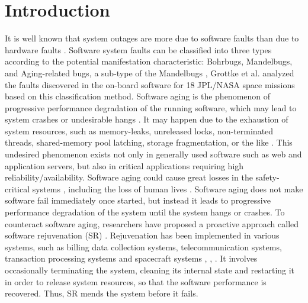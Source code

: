 \documentclass[10pt,journal,letterpaper,compsoc]{IEEEtran}
\begin{document}
%
\IEEEpeerreviewmaketitle

\section{Introduction} %
\label{intro}
It is well known that system outages are more due to software faults than due to hardware faults \cite{ChScience:SGarg1998IEEEJC}.
Software system faults can be classified into three types according to the
potential manifestation characteristic:
Bohrbugs, Mandelbugs, and Aging-related bugs,
a sub-type of the Mandelbugs \cite{ChScience:MGrottke2007IEEEMC},
Grottke et al. analyzed the faults discovered in the on-board software for
18 JPL/NASA space missions \cite{ChScience:MGrottke2010DSN}
based on this classification method. Software aging is the phenomenon of
progressive performance degradation of the running software,
which may lead to system crashes or undesirable hangs \cite{ChScience:SGarg1998ISSRE}.
It may happen due to the exhaustion of system resources, such as memory-leaks,
unreleased locks, non-terminated threads, shared-memory pool latching,
storage fragmentation, or the like \cite{ChScience:YHuang1995SFTC}.
This undesired phenomenon exists not only in generally used software such as web
and application servers, but also in critical applications requiring high
reliability/availability.
Software aging could cause great losses in
the safety-critical systems \cite{ChScience:YFJia2008APSEC},
including the loss of human lives \cite{ChScience:EMarshall1992Science}.
Software aging does not make software fail immediately once started,
but instead it leads to progressive performance degradation of the system until
the system hangs or crashes.
To counteract software aging, researchers have proposed a proactive approach
called software rejuvenation (SR) \cite{ChScience:SGarg1998ISSRE}.
Rejuvenation has been implemented in various systems,
such as billing data collection systems, telecommunication systems,
transaction processing systems and spacecraft
systems \cite{ChScience:KYCai2006JCST}, \cite{ChScience:KJCassidy2002ICDS},
\cite{ChScience:XMZhang2002JSS}.
It involves occasionally terminating the system,
cleaning its internal state and restarting it in order to release system resources,
so that the software performance is recovered.
Thus, SR mends the system before it fails.
\end{document}
